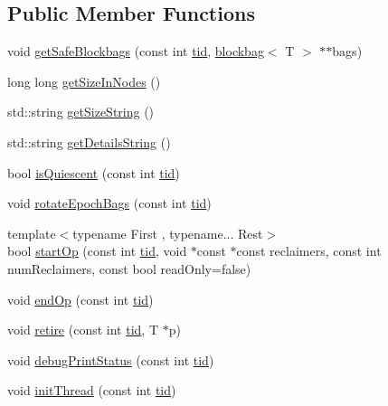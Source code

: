 \subsection*{Public Member Functions}
\begin{DoxyCompactItemize}
\item 
void \hyperlink{classreclaimer__debra_a5805415266e40f98b9fb4b403bf6552f}{get\+Safe\+Blockbags} (const int \hyperlink{microbench_2main_8cpp_a9ca9869868fe7e7a38a921cc7de4103f}{tid}, \hyperlink{classblockbag}{blockbag}$<$ T $>$ $\ast$$\ast$bags)
\item 
long long \hyperlink{classreclaimer__debra_a1f38d639ddc7801216d7add73d9e422b}{get\+Size\+In\+Nodes} ()
\item 
std\+::string \hyperlink{classreclaimer__debra_a36fe4dd91c4ffcf3dddd2f2660b03880}{get\+Size\+String} ()
\item 
std\+::string \hyperlink{classreclaimer__debra_a34e1d02bd691d3f889c38aa2c026ebbc}{get\+Details\+String} ()
\item 
bool \hyperlink{classreclaimer__debra_a687fe55221cbbd2b19210b24839e77ca}{is\+Quiescent} (const int \hyperlink{microbench_2main_8cpp_a9ca9869868fe7e7a38a921cc7de4103f}{tid})
\item 
void \hyperlink{classreclaimer__debra_a144015f870cce9bd1edbf95e109875ae}{rotate\+Epoch\+Bags} (const int \hyperlink{microbench_2main_8cpp_a9ca9869868fe7e7a38a921cc7de4103f}{tid})
\item 
{\footnotesize template$<$typename First , typename... Rest$>$ }\\bool \hyperlink{classreclaimer__debra_a354ecd5812c2521c68b82cb59b2529a5}{start\+Op} (const int \hyperlink{microbench_2main_8cpp_a9ca9869868fe7e7a38a921cc7de4103f}{tid}, void $\ast$const $\ast$const reclaimers, const int num\+Reclaimers, const bool read\+Only=false)
\item 
void \hyperlink{classreclaimer__debra_a668ee2af696ff2a3e84944ca9284014f}{end\+Op} (const int \hyperlink{microbench_2main_8cpp_a9ca9869868fe7e7a38a921cc7de4103f}{tid})
\item 
void \hyperlink{classreclaimer__debra_a146fa88ad65ef5a05d253ecb7281c698}{retire} (const int \hyperlink{microbench_2main_8cpp_a9ca9869868fe7e7a38a921cc7de4103f}{tid}, T $\ast$p)
\item 
void \hyperlink{classreclaimer__debra_a4e09296726d5118763f6a81868391e3b}{debug\+Print\+Status} (const int \hyperlink{microbench_2main_8cpp_a9ca9869868fe7e7a38a921cc7de4103f}{tid})
\item 
void \hyperlink{classreclaimer__debra_a5f6c09cd8120fba870b9162dc1b4232a}{init\+Thread} (const int \hyperlink{microbench_2main_8cpp_a9ca9869868fe7e7a38a921cc7de4103f}{tid})
$$
\end{DoxyCompactItemize}
